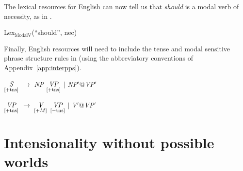The lexical resources for English can now tell us that \textit{should}
is a modal verb of necessity, as in \nexteg{}.
\begin{ex} 
Lex$_{\mathrm{ModalV}}$(``should'', nec) 
\end{ex} 
Finally, English resources will need to include the tense and modal
sensitive phrase structure rules in \nexteg{} (using the abbreviatory
conventions of Appendix~\ref{app:interpps}).
\begin{ex} 
\begin{subex} 
 
\item $\displaystyle\operatorname*{\textit{S}}_{[+\mathrm{tns}]}$ $\longrightarrow$ \textit{NP}
  $\displaystyle\operatorname*{\textit{VP}}_{[+\mathrm{tns}]}$ $\mid$ \textit{NP}$'$@\textit{VP}$'$ 
 
\item $\displaystyle\operatorname*{\textit{VP}}_{[+\mathrm{tns}]}$ $\longrightarrow$
  $\displaystyle\operatorname*{\textit{V}}_{[+M]}$ $\displaystyle\operatorname*{\textit{VP}}_{[-\mathrm{tns}]}$ $\mid$ \textit{V}$'$@\textit{VP}$'$ 
 
\end{subex} 
   
\end{ex} 
    
\section{Intensionality without possible worlds}
\label{sec:intensionality}

